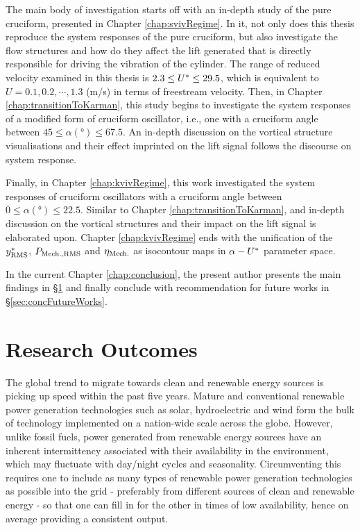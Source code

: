 \documentclass[oneside]{utmthesis}
\begin{document}
The main body of investigation starts off with an in-depth study of the pure cruciform, presented in Chapter \ref{chap:svivRegime}. In it, not only does this thesis reproduce the system responses of the pure cruciform, but also investigate the flow structures and how do they affect the lift generated that is directly responsible for driving the vibration of the cylinder. The range of reduced velocity examined in this thesis is $2.3 \leq U^{*} \leq 29.5$, which is equivalent to $U = 0.1, 0.2, \cdots, 1.3$ (m/s) in terms of freestream velocity. Then, in Chapter \ref{chap:transitionToKarman}, this study begins to investigate the system responses of a modified form of cruciform oscillator, i.e., one with a cruciform angle between $45 \leq \alpha (\si{\degree}) \leq 67.5$. An in-depth discussion on the vortical structure visualisations and their effect imprinted on the lift signal follows the discourse on system response.

Finally, in Chapter \ref{chap:kvivRegime}, this work investigated the system responses of cruciform oscillators with a cruciform angle between $0 \leq \alpha (\si{\degree}) \leq 22.5$. Similar to Chapter \ref{chap:transitionToKarman}, and in-depth discussion on the vortical structures and their impact on the lift signal is elaborated upon. Chapter \ref{chap:kvivRegime} ends with the unification of the $y^{*}_{\text{RMS}}$, $P_{\text{Mech.,RMS}}$ and $\eta_{\text{Mech.}}$ as isocontour maps in $\alpha - U^{*}$ parameter space. 

In the current Chapter \ref{chap:conclusion}, the present author presents the main findings in \S\ref{sec:concResearchOutcome} and finally conclude with recommendation for future works in \S\ref{sec:concFutureWorks}.

\section{Research Outcomes} \label{sec:concResearchOutcome}
The global trend to migrate towards clean and renewable energy sources is picking up speed within the past five years. Mature and conventional renewable power generation technologies such as solar, hydroelectric and wind form the bulk of technology implemented on a nation-wide scale across the globe. However, unlike fossil fuels, power generated from renewable energy sources have an inherent intermittency associated with their availability in the environment, which may fluctuate with day/night cycles and seasonality. Circumventing this requires one to include as many types of renewable power generation technologies as possible into the grid - preferably from different sources of clean and renewable energy - so that one can fill in for the other in times of low availability, hence on average providing a consistent output.
\end{document}
